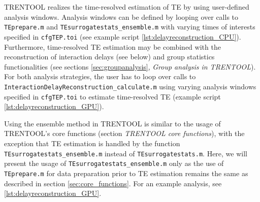 \documentclass[a4paper,10pt]{article}
\begin{document}
TRENTOOL realizes the time-resolved estimation of TE by using user-defined analysis windows. Analysis windows can be defined by looping over calls to \texttt{TEprepare.m} and \texttt{TEsurrogatestats\_ensemble.m} with varying times of interests specified in \texttt{cfgTEP.toi}  (see example script \ref{lst:delayreconstruction_CPU}). Furthermore, time-resolved TE estimation may be combined with the reconstruction of interaction delays (see below) and group statistics functionalities (see sections \ref{sec:groupanalysis}, \textit{Group analysis in TRENTOOL}). For both analysis strategies, the user has to loop over calls to \texttt{InteractionDelayReconstruction\_calculate.m} using varying analysis windows specified in \texttt{cfgTEP.toi} to estimate time-resolved TE (example script \ref{lst:delayreconstruction_GPU}).

Using the ensemble method in TRENTOOL is similar to the usage of TRENTOOL's core functions (section \textit{TRENTOOL core functions}), with the exception that TE estimation is handled by the function \texttt{TEsurrogatestats\_ensemble.m} instead of \texttt{TEsurrogatestats.m}. Here, we will present the usage of \texttt{TEsurrogatestats\_ensemble.m} only as the use of \texttt{TEprepare.m} for data preparation prior to TE estimation remains the same as described in section \ref{sec:core_functions}. For an example analysis, see \ref{lst:delayreconstruction_GPU}.
\end{document}
